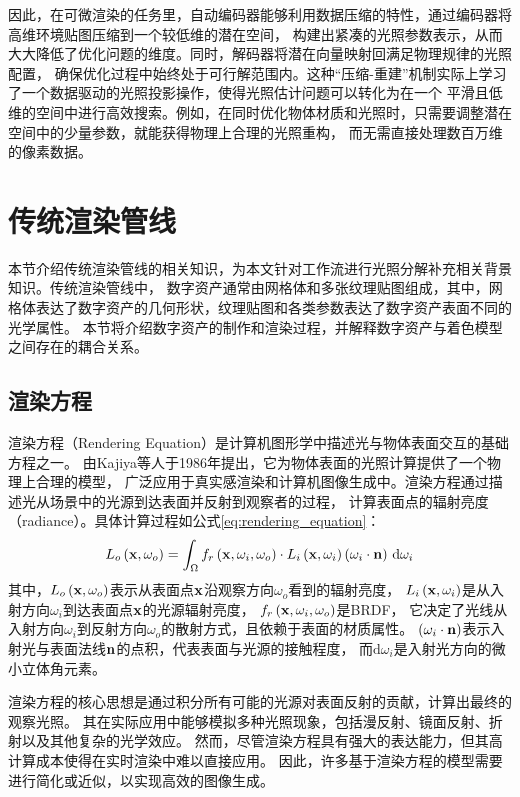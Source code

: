 因此，在可微渲染的任务里，自动编码器能够利用数据压缩的特性，通过编码器将高维环境贴图压缩到一个较低维的潜在空间，
构建出紧凑的光照参数表示，从而大大降低了优化问题的维度。同时，解码器将潜在向量映射回满足物理规律的光照配置，
确保优化过程中始终处于可行解范围内。这种“压缩-重建”机制实际上学习了一个数据驱动的光照投影操作，使得光照估计问题可以转化为在一个
平滑且低维的空间中进行高效搜索。例如，在同时优化物体材质和光照时，只需要调整潜在空间中的少量参数，就能获得物理上合理的光照重构，
而无需直接处理数百万维的像素数据。

\section{传统渲染管线}
本节介绍传统渲染管线的相关知识，为本文针对工作流进行光照分解补充相关背景知识。传统渲染管线中，
数字资产通常由网格体和多张纹理贴图组成，其中，网格体表达了数字资产的几何形状，纹理贴图和各类参数表达了数字资产表面不同的光学属性。
本节将介绍数字资产的制作和渲染过程，并解释数字资产与着色模型之间存在的耦合关系。

\subsection{渲染方程}


渲染方程（Rendering Equation）是计算机图形学中描述光与物体表面交互的基础方程之一。
由Kajiya等人于1986年提出\cite{Kajiya_1986}，它为物体表面的光照计算提供了一个物理上合理的模型，
广泛应用于真实感渲染和计算机图像生成中。渲染方程通过描述光从场景中的光源到达表面并反射到观察者的过程，
计算表面点的辐射亮度（radiance）。具体计算过程如公式\eqref{eq:rendering_equation}：
\begin{equation}\label{eq:rendering_equation}
  L_o\left({\bf{x}},\omega_o\right)=\int_{\Omega}f_r\left({\bf{x}},\omega_i,\omega_o\right)\cdot L_i\left({\bf{x}},
  \omega_i\right)\left(\omega_i\cdot\mathbf{n}\right)\,\mathrm{d}\omega_i
\end{equation}
其中，$L_o\left({\bf{x}},\omega_o\right)$表示从表面点$\bf{x}$沿观察方向$\omega_o$看到的辐射亮度，
$L_i\left({\bf{x}},\omega_i\right)$是从入射方向$\omega_i$到达表面点$\bf{x}$的光源辐射亮度，
$f_r\left({\bf{x}},\omega_i,\omega_o\right)$是BRDF，
它决定了光线从入射方向$\omega_i$到反射方向$\omega_o$的散射方式，且依赖于表面的材质属性。
$\left(\omega_i\cdot\bf{n}\right)$表示入射光与表面法线$\bf{n}$的点积，代表表面与光源的接触程度，
而$\mathrm{d}\omega_i$是入射光方向的微小立体角元素。

渲染方程的核心思想是通过积分所有可能的光源对表面反射的贡献，计算出最终的观察光照。
其在实际应用中能够模拟多种光照现象，包括漫反射、镜面反射、折射以及其他复杂的光学效应。
然而，尽管渲染方程具有强大的表达能力，但其高计算成本使得在实时渲染中难以直接应用。
因此，许多基于渲染方程的模型需要进行简化或近似，以实现高效的图像生成。

